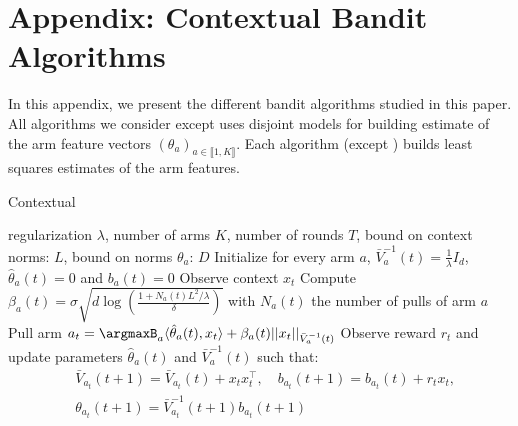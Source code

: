 \section{Appendix: Contextual Bandit Algorithms}\label{app:algorithms}

In this appendix, we present the different bandit algorithms studied in this paper. All algorithms we consider except \expfour uses disjoint models for building estimate of the arm feature vectors $(\theta_{a})_{a\in\llbracket 1, K\rrbracket}$. Each algorithm (except \expfour) builds least squares estimates of the arm features.

\begin{algorithm}[H]
  \caption{Contextual \linucb}
  \label{alg:linucb}
\begin{algorithmic}
   regularization  $\lambda$, number of arms $K$, number of rounds $T$, bound on context norms: $L$, bound on norms $\theta_{a}$: $D$
  \STATE Initialize for every arm $a$, $\bar{V}_{a}^{-1}(t) = \frac1\lambda I_{d}$, $\hat{\theta}_{a}(t) = 0$ and $b_{a}(t) = 0$
  \STATE Observe context $x_{t}$
  \STATE Compute $\beta_{a}(t) = \sigma\sqrt{d\log\left(\frac{1 +  N_{a}(t)L^{2}/\lambda}{\delta}\right)}$ with $N_{a}(t)$ the number of pulls of arm $a$
  \STATE Pull arm  $a_{t} =\argmaxB_a \langle \hat{\theta}_{a}(t),x_t\rangle + \beta_{a}(t)||x_{t}||_{\bar{V}_{a}^{-1}(t)}$
  \STATE Observe reward $r_{t}$ and update parameters $\hat{\theta}_{a}(t)$ and $\bar{V}_{a}^{-1}(t)$ such that:
  \begin{align*}
      &\bar{V}_{a_{t}}(t+1) = \bar{V}_{a_{t}}(t) + x_{t}x_{t}^{\intercal},\quad b_{a_{t}}(t+1) = b_{a_{t}}(t) + r_{t}x_{t},\\
      &\theta_{a_{t}}(t+1) = \bar{V}_{a_{t}}^{-1}(t+1)b_{a_{t}}(t+1)
  \end{align*}
  \ENDFOR
\end{algorithmic}
\end{algorithm}

